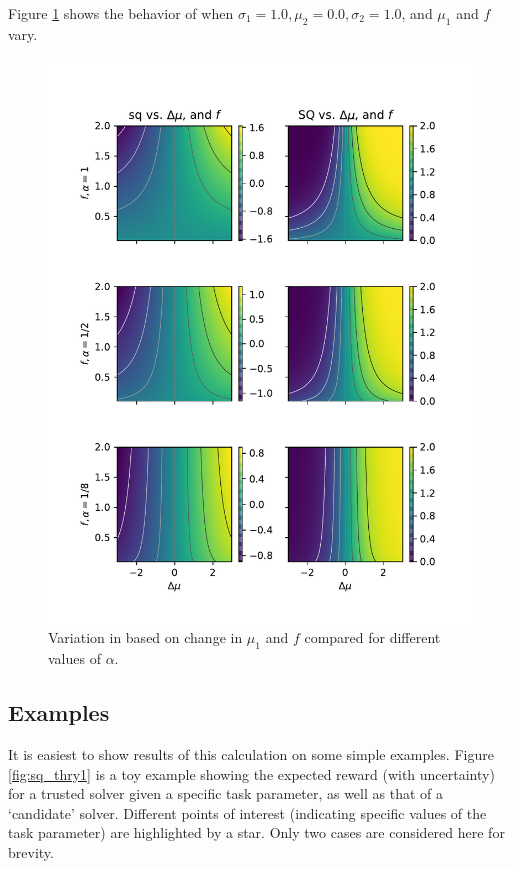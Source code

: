 Figure \ref{fig:sq_surf} shows the behavior of \xQ{} when $\sigma_1=1.0,\mu_2=0.0,\sigma_2=1.0$, and $\mu_1$ and $f$ vary.

\begin{figure}[tbp]
    \centering
    \includegraphics[width=0.9\linewidth]{Figures/sq_surf}
    \caption{Variation in \xQ{} based on change in $\mu_1$ and $f$ compared for different values of $\alpha$.}
    \label{fig:sq_surf}
\end{figure}

\subsection{Examples}
It is easiest to show results of this calculation on some simple examples. Figure \ref{fig:sq_thry1} is a toy example showing the expected reward (with uncertainty) for a trusted solver given a specific task parameter, as well as that of a `candidate' solver. Different points of interest (indicating specific values of the task parameter) are highlighted by a star. Only two cases are considered here for brevity.

